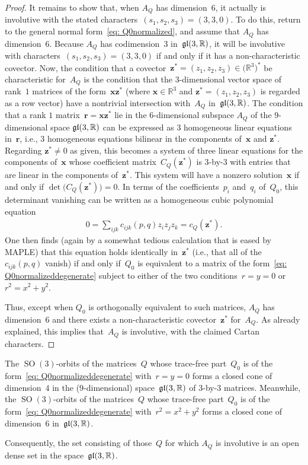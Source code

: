 \documentclass[11pt]{article}
\numberwithin{equation}{section}
\newcommand{\bbR}{{\mathbb R}}
\newcommand{\SO}{\operatorname{SO}}
\newcommand{\eugl}{\operatorname{\frak{gl}}}
\newcommand{\mbx}{\mathbf{x}}
\newcommand{\mbz}{\mathbf{z}}
\begin{document}
\begin{proof}
It remains to show that, when $A_Q$ has dimension~$6$,
it actually is involutive with the stated characters~$(s_1,s_2,s_3)=(3,3,0)$.
To do this, return to the general normal form~\eqref{eq: Q0normalized},
and assume that $A_Q$ has dimension~$6$.
Because $A_Q$ has codimension~$3$ in~$\eugl(3,\bbR)$,
it will be involutive with characters~$(s_1,s_2,s_3)=(3,3,0)$
if and only if it has a non-characteristic covector.
Now, the condition that a covector~$\mbz^* = (z_1,z_2,z_3)\in \big(\bbR^3\big)^*$
be characteristic for~$A_Q$ is the condition
that the $3$-dimensional vector space of rank~$1$ matrices
of the form~$\mbx \mbz^*$ (where $\mbx\in\bbR^3$ and $\mbz^* = (z_1,z_2,z_3)$
is regarded as a row vector) have a nontrivial intersection
with~$A_Q$ in~$\eugl(3,\mathbb{R})$.
The condition that a rank $1$ matrix~$\mathbf{r} = \mathbf{x}\mathbf{z}^*$
lie in the $6$-dimensional subspace $A_Q$ of the $9$-dimensional space
$\frak{gl}(3,\mathbb{R})$ can be expressed as 3 homogeneous linear equations in~$\mathbf{r}$,
i.e., $3$ homogeneous equations bilinear in the components
of~$\mathbf{x}$ and $\mathbf{z}^*$. Regarding $\mathbf{z}^*\not=0$ as given,
this becomes a system of three linear equations for the components
of~$\mathbf{x}$ whose coefficient matrix~$C_Q(\mathbf{z}^*)$ is $3$-by-$3$
with entries that are linear in the components of~$\mathbf{z}^*$.
This system will have a nonzero solution~$\mathbf{x}$
if and only if $\det\bigl(C_Q(\mathbf{z}^*)\bigr) = 0$.
In terms of the coefficients~$p_i$ and~$q_i$ of~$Q_0$,
this determinant vanishing can be written
as a homogeneous cubic polynomial equation
\begin{gather*}%
0 = \sum_{ijk} c_{ijk}(p,q) z_i z_j z_k = c_Q(\mbz^*).
\end{gather*}
One then finds (again by a somewhat tedious calculation
that is eased by MAPLE) that this equation holds identically in~$\mbz^*$
(i.e., that all of the~$c_{ijk}(p,q)$ vanish) if and only if~$Q_0$
is equivalent to a matrix of the form~\eqref{eq: Q0normalizeddegenerate}
subject to either of the two conditions~$r=y=0$ or $r^2 = x^2+y^2$.

Thus, except when $Q_0$ is orthogonally equivalent to such matrices,
$A_Q$ has dimension~$6$ and there exists a non-characteristic covector~$\mbz^*$ for~$A_Q$. As already explained, this implies that~$A_Q$ is
involutive, with the claimed Cartan characters.
\end{proof}

\begin{Remark}The $\SO(3)$-orbits of the matrices~$Q$
whose trace-free part~$Q_0$
is of the form~\eqref{eq: Q0normalizeddegenerate}
with~$r=y=0$ forms a closed cone of dimension~$4$
in the ($9$-dimensional) space~$\eugl(3,\mathbb{R})$
of $3$-by-$3$ matrices.
Meanwhile, the $\SO(3)$-orbits of the matrices~$Q$
whose trace-free part~$Q_0$
is of the form~\eqref{eq: Q0normalizeddegenerate}
with~$r^2=x^2+y^2$ forms a closed cone of dimension~$6$
in~$\eugl(3,\mathbb{R})$.

Consequently, the set consisting of those~$Q$
for which $A_Q$ is involutive is an open dense set
in the space~$\eugl(3,\mathbb{R})$.
\end{Remark}
\end{document}
